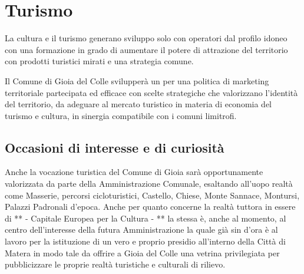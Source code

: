 \documentclass[a4paper,14pt,italian]{sphinxmanual}
\begin{document}
\chapter{Turismo}
\label{\detokenize{turismo:turismo}}\label{\detokenize{turismo::doc}}


La cultura e il turismo generano sviluppo solo con operatori dal profilo idoneo con una formazione in grado di aumentare il potere di attrazione del territorio con prodotti turistici mirati e una strategia comune.

Il Comune di Gioia del Colle svilupperà un  per una politica di marketing territoriale partecipata ed efficace con scelte strategiche che valorizzano l’identità del territorio, da adeguare al mercato turistico in materia di economia del turismo e cultura, in sinergia compatibile con i comuni limitrofi.


\section{Occasioni di interesse e di curiosità}
\label{\detokenize{turismo:occasioni-di-interesse-e-di-curiosita}}

Anche la vocazione turistica del Comune di Gioia sarà opportunamente valorizzata da parte della Amministrazione Comunale, esaltando all’uopo realtà come Masserie, percorsi cicloturistici, Castello, Chiese, Monte Sannace, Montursi, Palazzi Padronali d’epoca.
Anche per quanto concerne la realtà tuttora in essere di **  - Capitale Europea per la Cultura - ** la stessa è, anche al momento, al centro dell’interesse della futura Amministrazione la quale già sin d’ora è al lavoro per la istituzione di un vero e proprio presidio all’interno della Città di Matera in modo tale da offrire a Gioia del Colle una vetrina privilegiata per pubblicizzare le proprie realtà turistiche e culturali di rilievo.
\end{document}
